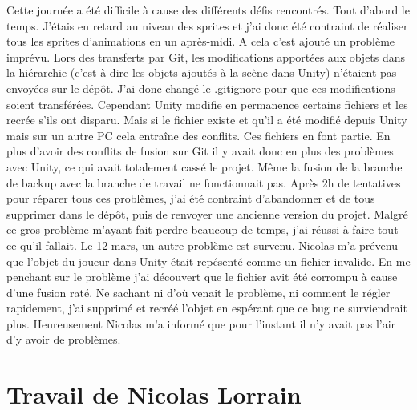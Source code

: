 \documentclass[]{extarticle}
\begin{document}
\begin{spacing}{1.25}
Cette journée a été difficile à cause des différents défis rencontrés. Tout d'abord le temps. J'étais en retard au niveau des sprites et j’ai donc été contraint de réaliser tous les sprites d'animations en un après-midi. A cela c’est ajouté un problème imprévu. Lors des transferts par Git, les modifications apportées aux objets dans la hiérarchie (c'est-à-dire les objets ajoutés à la scène dans Unity) n'étaient pas envoyées sur le dépôt. J'ai donc changé le .gitignore pour que ces modifications soient transférées. Cependant Unity modifie en permanence certains fichiers et les recrée s'ils ont disparu. Mais si le fichier existe et qu'il a été modifié depuis Unity mais sur un autre PC cela entraîne des conflits. Ces fichiers en font partie. En plus d’avoir des conflits de fusion sur Git il y avait donc en plus des problèmes avec Unity, ce qui avait totalement cassé le projet. Même la fusion de la branche de backup avec la branche de travail ne fonctionnait pas. Après 2h de tentatives pour réparer tous ces problèmes, j'ai été contraint d'abandonner et de tous supprimer dans le dépôt, puis de renvoyer une ancienne version du projet. Malgré ce gros problème m'ayant fait perdre beaucoup de temps, j'ai réussi à faire tout ce qu'il fallait.
\bigbreak
Le 12 mars, un autre problème est survenu. Nicolas m’a prévenu que l’objet du joueur dans Unity était repésenté comme un fichier invalide. En me penchant sur le problème j’ai découvert que le fichier avit été corrompu à cause d’une fusion raté. Ne sachant ni d’où venait le problème, ni comment le régler rapidement, j’ai supprimé et recréé l’objet en espérant que ce bug ne surviendrait plus. Heureusement Nicolas m’a informé que pour l’instant il n’y avait pas l’air d’y avoir de problèmes.
\newpage


\section{Travail de Nicolas Lorrain}


\end{spacing}
\end{document}
